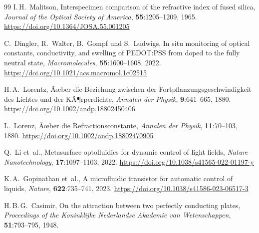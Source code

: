 ﻿\documentclass[a4paper,12pt]{article}
\theoremstyle{definition}
\begin{document}
\begin{thebibliography}{99}
		I.\,H.~Malitson,
		\newblock Interspecimen comparison of the refractive index of fused silica,
		\newblock \emph{Journal of the Optical Society of America},
		\textbf{55}:1205--1209, 1965.
		\newblock \url{https://doi.org/10.1364/JOSA.55.001205}
		
		C.~Dingler, R.~Walter, B.~Gompf und S.~Ludwigs,
		\newblock In situ monitoring of optical constants, conductivity, and swelling
		of {PEDOT:PSS} from doped to the fully neutral state,
		\newblock \emph{Macromolecules}, \textbf{55}:1600--1608, 2022.
		\newblock \url{https://doi.org/10.1021/acs.macromol.1c02515}
		
		
		H.\,A.~Lorentz,
		\newblock Ãœber die Beziehung zwischen der Fortpflanzungsgeschwindigkeit des
		Lichtes und der KÃ¶rperdichte,
		\newblock \emph{Annalen der Physik}, \textbf{9}:641--665, 1880.
		\newblock \url{https://doi.org/10.1002/andp.18802450406}
		
		L.~Lorenz,
		\newblock Ãœber die Refractionsconstante,
		\newblock \emph{Annalen der Physik}, \textbf{11}:70--103, 1880.
		\newblock \url{https://doi.org/10.1002/andp.18802470905}
		
		
		Q.~Li et~al.,
		\newblock Metasurface optofluidics for dynamic control of light fields,
		\newblock \emph{Nature Nanotechnology}, \textbf{17}:1097--1103, 2022.
		\newblock \url{https://doi.org/10.1038/s41565-022-01197-y}
		
		K.\,A.~Gopinathan et~al.,
		\newblock A microfluidic transistor for automatic control of liquids,
		\newblock \emph{Nature}, \textbf{622}:735--741, 2023.
		\newblock \url{https://doi.org/10.1038/s41586-023-06517-3}
		
		
		H.\,B.\,G.~Casimir,
		\newblock On the attraction between two perfectly conducting plates,
		\newblock \emph{Proceedings of the Koninklijke Nederlandse Akademie van
			Wetenschappen}, \textbf{51}:793--795, 1948.
		

\end{thebibliography}
\end{document}

